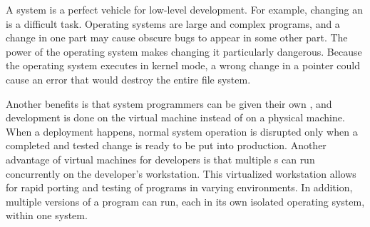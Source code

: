 A  system is a perfect vehicle for low-level development.
For example, changing an  is a difficult task.
Operating systems are large and complex programs, and a change in one part may cause obscure bugs to appear in some other part.
The power of the operating system makes changing it particularly dangerous.
Because the operating system executes in kernel mode, a wrong change in a pointer could cause an error that would destroy the entire file system.

Another benefits is that system programmers can be given their own , and development is done on the virtual machine instead of on a physical machine.
When a deployment happens, normal system operation is disrupted only when a completed and tested change is ready to be put into production.
Another advantage of virtual machines for developers is that multiple s can run concurrently on the developer’s workstation.
This virtualized workstation allows for rapid porting and testing of programs in varying environments.
In addition, multiple versions of a program can run, each in its own isolated operating system, within one system.


